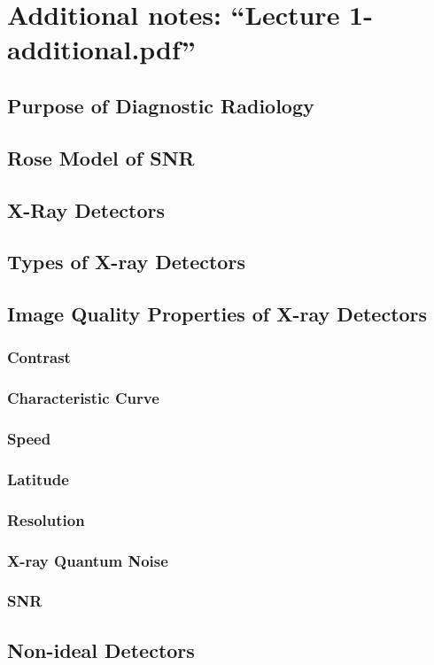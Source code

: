 \documentclass[11pt]{article}
\begin{document}
\newpage
\section{Additional notes: ``Lecture 1-additional.pdf''}
\subsection{Purpose of Diagnostic Radiology}
\subsection{Rose Model of SNR}
\subsection{X-Ray Detectors}
\subsection{Types of X-ray Detectors}
\subsection{Image Quality Properties of X-ray Detectors}
\subsubsection{Contrast}
\subsubsection{Characteristic Curve}
\subsubsection{Speed}
\subsubsection{Latitude}
\subsubsection{Resolution}
\subsubsection{X-ray Quantum Noise}
\subsubsection{SNR}
\subsection{Non-ideal Detectors}
\end{document}
